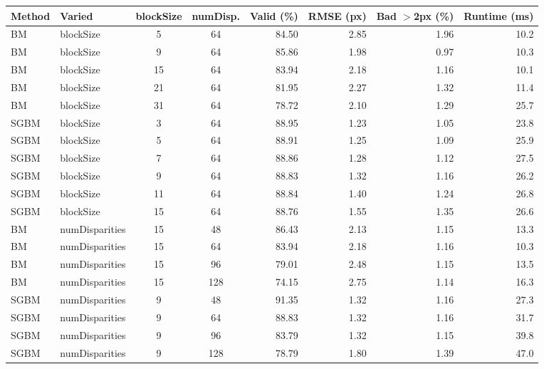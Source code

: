 \begin{tabular}{llccrrrr}
\toprule
Method & Varied & blockSize & numDisp. & Valid (\%) & RMSE (px) & Bad $>$2px (\%) & Runtime (ms) \\
\midrule
BM & blockSize & 5 & 64 & 84.50 & 2.85 & 1.96 & 10.2 \\
BM & blockSize & 9 & 64 & 85.86 & 1.98 & 0.97 & 10.3 \\
BM & blockSize & 15 & 64 & 83.94 & 2.18 & 1.16 & 10.1 \\
BM & blockSize & 21 & 64 & 81.95 & 2.27 & 1.32 & 11.4 \\
BM & blockSize & 31 & 64 & 78.72 & 2.10 & 1.29 & 25.7 \\
SGBM & blockSize & 3 & 64 & 88.95 & 1.23 & 1.05 & 23.8 \\
SGBM & blockSize & 5 & 64 & 88.91 & 1.25 & 1.09 & 25.9 \\
SGBM & blockSize & 7 & 64 & 88.86 & 1.28 & 1.12 & 27.5 \\
SGBM & blockSize & 9 & 64 & 88.83 & 1.32 & 1.16 & 26.2 \\
SGBM & blockSize & 11 & 64 & 88.84 & 1.40 & 1.24 & 26.8 \\
SGBM & blockSize & 15 & 64 & 88.76 & 1.55 & 1.35 & 26.6 \\
BM & numDisparities & 15 & 48 & 86.43 & 2.13 & 1.15 & 13.3 \\
BM & numDisparities & 15 & 64 & 83.94 & 2.18 & 1.16 & 10.3 \\
BM & numDisparities & 15 & 96 & 79.01 & 2.48 & 1.15 & 13.5 \\
BM & numDisparities & 15 & 128 & 74.15 & 2.75 & 1.14 & 16.3 \\
SGBM & numDisparities & 9 & 48 & 91.35 & 1.32 & 1.16 & 27.3 \\
SGBM & numDisparities & 9 & 64 & 88.83 & 1.32 & 1.16 & 31.7 \\
SGBM & numDisparities & 9 & 96 & 83.79 & 1.32 & 1.15 & 39.8 \\
SGBM & numDisparities & 9 & 128 & 78.79 & 1.80 & 1.39 & 47.0 \\
\bottomrule
\end{tabular}
